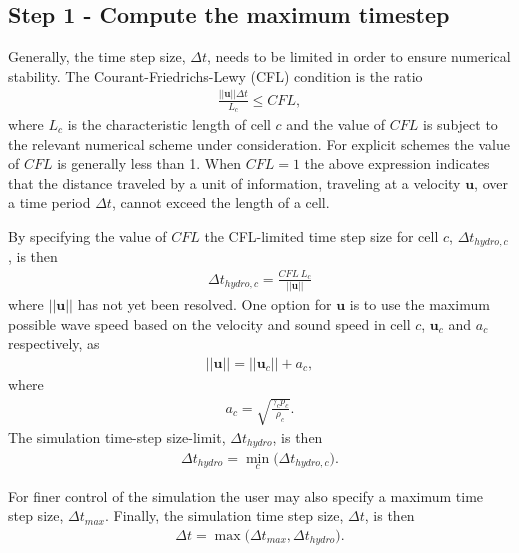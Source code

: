 \documentclass[10pt,letterpaper,notitlepage]{article}
\numberwithin{equation}{section}
\newcommand{\beqn}{\begin{equation}\begin{aligned}}
\newcommand{\eeqn}{\end{aligned}\end{equation}}
\begin{document}
\subsection{Step 1 - Compute the maximum timestep}
Generally, the time step size, $\Delta t$, needs to be limited in order to ensure numerical stability. The Courant-Friedrichs-Lewy (CFL) condition is the ratio
\beqn 
\frac{||\mathbf{u}|| \Delta t}{L_c} \le CFL,
\eeqn 
where $L_c$ is the characteristic length of cell $c$ and the value of $CFL$ is subject to the relevant numerical scheme under consideration. For explicit schemes the value of $CFL$ is generally less than 1. When $CFL=1$ the above expression indicates that the distance traveled by a unit of information, traveling at a velocity $\mathbf{u}$, over a time period $\Delta t$, cannot exceed the length of a cell. 

By specifying the value of $CFL$ the CFL-limited time step size for cell $c$, $\Delta t_{hydro,c}$, is then
\beqn 
\Delta t_{hydro,c} = \frac{CFL \ L_c}{||\mathbf{u}||}
\eeqn 
where $||\mathbf{u}||$ has not yet been resolved. One option for $\mathbf{u}$ is to use the maximum possible wave speed based on the velocity and sound speed in cell $c$, $\mathbf{u}_c$ and $a_c$ respectively, as
\beqn 
||\mathbf{u}||= ||\mathbf{u}_c|| + a_c,
\eeqn
where
\beqn 
a_c = \sqrt{\frac{\gamma_c p_c}{\rho_c}}.
\eeqn 
The simulation time-step size-limit, $\Delta t_{hydro}$, is then 
\beqn 
\Delta t_{hydro} = \min_c \biggr(\Delta t_{hydro,c}\biggr).
\eeqn 

For finer control of the simulation the user may also specify a maximum time step size, $\Delta t_{max}$. Finally, the simulation time step size, $\Delta t$, is then
\beqn 
\Delta t = \max \biggr( \Delta t_{max}, \Delta t_{hydro}\biggr).
\eeqn 
\end{document}
